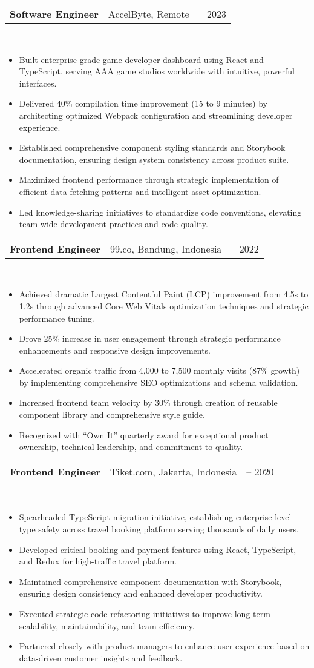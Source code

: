 \documentclass[a4paper, 11pt]{article}
\newcommand{\resumeItem}[1]{
  \item\small{
    {#1 \vspace{-2pt}}
  }
}
\newcommand{\resumeSubheading}[4]{
  \vspace{-2pt}\item
    \begin{tabularx}{0.987\textwidth}[t]{
  >{\raggedright\arraybackslash}X
  >{\centering\arraybackslash}X
  >{\raggedleft\arraybackslash}X }
      \textbf{#1} & #2 & #3 \\
    \end{tabularx}
    \textit{\small#4}\\
    \vspace{-7pt}
}
\newcommand{\resumeItemListStart}{\begin{itemize}[leftmargin=0.22in]}
\newcommand{\resumeItemListEnd}{\end{itemize}\vspace{-20pt}}
\begin{document}
        \resumeSubheading
            {Software Engineer}{AccelByte, Remote}{2022 -- 2023}{}
            \resumeItemListStart
                \resumeItem{Built enterprise-grade game developer dashboard using React and TypeScript, serving AAA game studios worldwide with intuitive, powerful interfaces.}
                \resumeItem{Delivered 40\% compilation time improvement (15 to 9 minutes) by architecting optimized Webpack configuration and streamlining developer experience.}
                \resumeItem{Established comprehensive component styling standards and Storybook documentation, ensuring design system consistency across product suite.}
                \resumeItem{Maximized frontend performance through strategic implementation of efficient data fetching patterns and intelligent asset optimization.}
                \resumeItem{Led knowledge-sharing initiatives to standardize code conventions, elevating team-wide development practices and code quality.}
            \resumeItemListEnd

        \resumeSubheading
            {Frontend Engineer}{99.co, Bandung, Indonesia}{2020 -- 2022}{}
            \resumeItemListStart
                \resumeItem{Achieved dramatic Largest Contentful Paint (LCP) improvement from 4.5s to 1.2s through advanced Core Web Vitals optimization techniques and strategic performance tuning.}
                \resumeItem{Drove 25\% increase in user engagement through strategic performance enhancements and responsive design improvements.}
                \resumeItem{Accelerated organic traffic from 4,000 to 7,500 monthly visits (87\% growth) by implementing comprehensive SEO optimizations and schema validation.}
                \resumeItem{Increased frontend team velocity by 30\% through creation of reusable component library and comprehensive style guide.}
                \resumeItem{Recognized with ``Own It'' quarterly award for exceptional product ownership, technical leadership, and commitment to quality.}
            \resumeItemListEnd

        \resumeSubheading
            {Frontend Engineer}{Tiket.com, Jakarta, Indonesia}{2019 -- 2020}{}
            \resumeItemListStart
                \resumeItem{Spearheaded TypeScript migration initiative, establishing enterprise-level type safety across travel booking platform serving thousands of daily users.}
                \resumeItem{Developed critical booking and payment features using React, TypeScript, and Redux for high-traffic travel platform.}
                \resumeItem{Maintained comprehensive component documentation with Storybook, ensuring design consistency and enhanced developer productivity.}
                \resumeItem{Executed strategic code refactoring initiatives to improve long-term scalability, maintainability, and team efficiency.}
                \resumeItem{Partnered closely with product managers to enhance user experience based on data-driven customer insights and feedback.}
            \resumeItemListEnd
\end{document}
